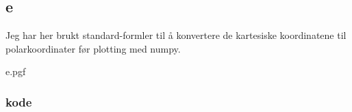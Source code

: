 \subsection{e}

Jeg har her brukt standard-formler til å konvertere de kartesiske koordinatene til polarkoordinater før plotting med numpy.

{e.pgf}

\newpage

\subsubsection{kode}

